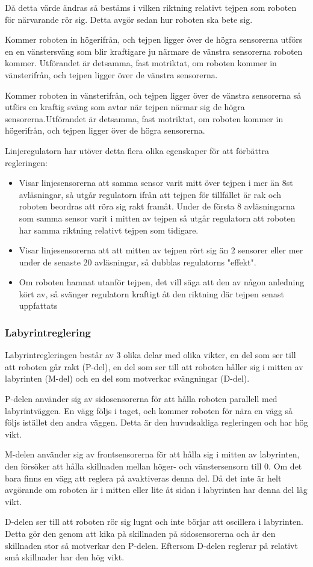Då detta värde ändras så bestäms i vilken riktning relativt tejpen som roboten för närvarande rör sig. Detta avgör sedan hur roboten ska bete sig.

Kommer roboten in högerifrån, och tejpen ligger över de högra sensorerna utförs en en vänstersväng som blir kraftigare ju närmare de vänstra sensorerna roboten kommer. Utförandet är detsamma, fast motriktat, om roboten kommer in vänsterifrån, och tejpen ligger över de vänstra sensorerna.

Kommer roboten in vänsterifrån, och tejpen ligger över de vänstra sensorerna så utförs en kraftig sväng som avtar när tejpen närmar sig de högra sensorerna.Utförandet är detsamma, fast motriktat, om roboten kommer in högerifrån, och tejpen ligger över de högra sensorerna.


Linjeregulatorn har utöver detta flera olika egenskaper för att förbättra regleringen:
\begin{itemize}
\item Visar linjesensorerna att samma sensor varit mitt över tejpen i mer än 8st avläsningar, så utgår regulatorn ifrån att tejpen för tillfället är rak och roboten beordras att röra sig rakt framåt. Under de första 8 avläsningarna som samma sensor varit i mitten av tejpen så utgår regulatorn att roboten har samma riktning relativt tejpen som tidigare.
\item Visar linjesensorerna att att mitten av tejpen rört sig än 2 sensorer eller mer under de senaste 20 avläsningar, så dubblas regulatorns "effekt".
\item Om roboten hamnat utanför tejpen, det vill säga att den av någon anledning kört av, så svänger regulatorn kraftigt åt den riktning där tejpen senast uppfattats
\end{itemize}



\subsubsection{Labyrintreglering}
Labyrintregleringen består av 3 olika delar med olika vikter,
en del som ser till att roboten går rakt (P-del), en del som ser till att
roboten håller sig i mitten av labyrinten (M-del) och en del som motverkar
svängningar (D-del).


P-delen använder sig av sidosensorerna för att hålla roboten parallell med
labyrintväggen. En vägg följs i taget, och kommer roboten för nära en vägg så
följs istället den andra väggen. Detta är den huvudsakliga regleringen och har
hög vikt.


M-delen använder sig av frontsensorerna för att hålla sig i mitten av
labyrinten, den försöker att hålla skillnaden mellan höger- och vänstersensorn
till 0. Om det bara finns en vägg att reglera på avaktiveras denna del. Då det
inte är helt avgörande om roboten är i mitten eller lite åt sidan i labyrinten
har denna del låg vikt.


D-delen ser till att roboten rör sig lugnt och inte börjar att oscillera i
labyrinten. Detta gör den genom att kika på skillnaden på sidosensorerna och är
den skillnaden stor så motverkar den P-delen. Eftersom D-delen reglerar på
relativt små skillnader har den hög vikt.

\label{reglering}
